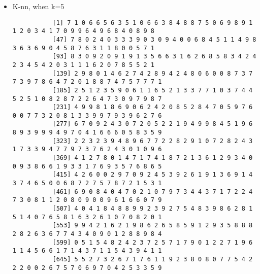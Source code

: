 \documentclass{article}
\begin{document}
\begin{itemize}
\begin{scriptsize}
\begin{verbatim}
	[3393] 2 3 0 7 2 1 9 0 3 7 6 0 8 1 5 2 9 5 3 9 8 5 2 9 2 5 1 6 8 3 2 8 9 7 0 1 2 0 0 8 3 5 7 0 9 9 7 9 1 4 1 2 5
	[3446] 9 0 2 4 6 1 0 0 9 4 0 7 7 6 5 2 5 1 2 9 5 4 5 8 8 9 7 5 9 1 6 7 7 7 8 5 3 2 3 6 0 1 9 8 0 7 2 1 5 1 1 4 0
	[3499] 7 7 4 9 5 5 1 4 4 3 3 9 2 7 7 1 4 0 3 5 6 0 8 4 0 8 5 6 5 7 3 0 4 1 5 7 3 2 6 6 7 7 1 2 2 6 9 0 7 8 1 0 4
	[3552] 1 7 8 3 9 2 7 0 1 8 6 2 8 5 6 9 7 7 4 4 5 0 8 7 7 0 2 3 7 6 4 8 3 1 3 6 2 9 3 7 8 5 6 4 9 1 3 0 3 4 3 0 2
	[3605] 7 9 0 7 7 3 5 5 3 7 2 3 1 7 7 8 4 0 6 7 4 0 0 5 1 7 1 1 6 6 8 8 9 9 8 7 3 4 4 4 3 9 2 4 3 1 2 3 3 1 0 1 6
	[3658] 3 4 6 7 3 4 5 8 2 7 6 0 9 6 0 1 7 1 8 9 8 7 1 5 4 4 8 1 4 1 6 6 0 3 5 7 2 7 5 4 1 2 0 1 9 0 2 6 4 8 9 3 3
	[3711] 0 3 5 9 4 3 0 3 7 7 0 3 3 3 1 1 1 3 6 8 4 2 7 6 4 1 9 2 6 3 9 0 5 4 5 1 7
	\end{verbatim}

 	\end{scriptsize}
	\item K-nn, when k=5\\
	\begin{scriptsize}
		\begin{verbatim}
		   [1] 7 1 0 6 6 5 6 3 5 1 0 6 6 3 8 4 8 8 7 5 0 6 9 8 9 1 1 2 0 3 4 1 7 0 9 9 6 4 9 6 8 4 0 8 9 8
		   [47] 7 8 0 2 4 0 3 3 3 9 0 3 0 9 4 0 0 6 8 4 5 1 1 4 9 8 3 6 3 6 9 0 4 5 8 7 6 3 1 1 8 0 0 5 7 1
		   [93] 8 3 0 9 2 0 9 1 9 1 3 5 6 6 3 1 6 2 6 8 5 8 3 4 2 4 2 3 4 5 4 2 0 3 1 1 1 6 2 0 7 8 5 5 2 1
		   [139] 2 9 8 0 1 4 6 2 7 4 2 8 9 4 2 4 8 0 6 0 0 8 7 3 7 7 3 9 7 8 6 4 7 2 0 1 8 8 7 4 7 5 7 7 7 1
		   [185] 2 5 1 2 3 5 9 0 6 1 1 6 5 2 1 3 3 7 7 1 0 3 7 4 4 5 2 5 1 0 8 2 8 7 2 2 6 4 7 3 0 9 7 9 8 7
		   [231] 4 9 9 8 1 8 6 9 0 6 2 4 2 0 8 5 2 8 4 7 0 5 9 7 6 0 0 7 7 3 2 0 8 1 3 3 9 9 7 9 3 9 6 2 7 6
		   [277] 6 7 0 9 2 4 3 0 7 2 0 5 2 2 1 9 4 9 9 8 4 5 1 9 6 8 9 3 9 9 9 4 9 7 0 4 1 6 6 6 0 5 8 3 5 9
		   [323] 2 2 3 2 3 9 4 8 9 6 7 7 2 2 8 2 9 1 0 7 2 8 2 4 3 1 7 3 3 9 4 7 7 9 7 3 7 6 2 4 3 0 1 0 9 6
		   [369] 4 1 2 7 8 0 1 4 7 1 7 4 1 8 7 2 1 3 6 1 2 9 3 4 0 0 9 3 8 6 6 1 9 3 3 1 7 6 9 3 5 7 6 8 6 5
		   [415] 4 2 6 0 0 2 9 7 0 9 2 4 5 3 9 2 6 1 9 1 3 6 9 1 4 3 7 4 6 5 0 0 6 8 7 2 7 5 7 8 7 2 1 5 3 1
		   [461] 6 9 0 8 4 0 4 7 0 2 1 0 7 9 7 3 4 4 3 7 1 7 2 2 4 7 3 0 8 1 1 2 0 8 0 9 0 0 9 6 1 6 6 0 7 9
		   [507] 4 0 4 1 8 4 8 8 9 9 2 3 9 2 7 5 4 8 3 9 8 6 2 8 1 5 1 4 0 7 6 5 8 1 6 3 2 6 1 0 7 0 8 2 0 1
		   [553] 9 9 4 2 1 6 2 1 9 8 6 2 6 5 8 5 9 1 2 9 3 5 8 8 8 2 8 2 6 3 6 7 7 4 3 4 0 9 0 1 2 8 8 9 8 4
		   [599] 0 5 1 5 4 8 2 4 2 3 7 2 5 7 1 7 9 0 1 2 2 7 1 9 6 1 1 4 5 6 6 1 7 1 4 3 7 1 1 5 4 3 9 4 1 1
		   [645] 5 5 2 7 3 2 6 7 1 7 6 1 1 9 2 3 8 0 8 0 7 7 5 4 2 2 2 0 0 2 6 7 5 7 0 6 9 7 0 4 2 5 3 3 5 9

\end{verbatim}
\end{scriptsize}
\end{itemize}
\end{document}
